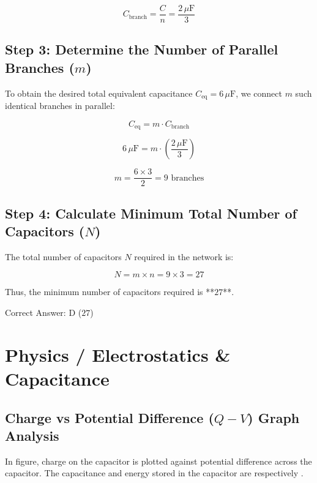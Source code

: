 \begin{solution}
$$C_{\text{branch}} = \frac{C}{n} = \frac{2\,\mu\text{F}}{3}$$

\subsection*{Step 3: Determine the Number of Parallel Branches ($m$)}
To obtain the desired total equivalent capacitance $C_{\text{eq}} = 6\,\mu\text{F}$, we connect $m$ such identical branches in parallel:

$$C_{\text{eq}} = m \cdot C_{\text{branch}}$$

$$6\,\mu\text{F} = m \cdot \left(\frac{2\,\mu\text{F}}{3}\right)$$

$$m = \frac{6 \times 3}{2} = 9\text{ branches}$$

\subsection*{Step 4: Calculate Minimum Total Number of Capacitors ($N$)}
The total number of capacitors $N$ required in the network is:

$$N = m \times n = 9 \times 3 = 27$$

Thus, the minimum number of capacitors required is **$27$**.

Correct Answer: D ($27$)
\end{solution}

\clearpage

\section{Physics / Electrostatics \& Capacitance}


\subsection{Charge vs Potential Difference ($Q-V$) Graph Analysis}


In figure, charge on the capacitor is plotted against potential difference across the capacitor. The capacitance and energy stored in the capacitor are respectively \underline{\hspace{2cm}}.

